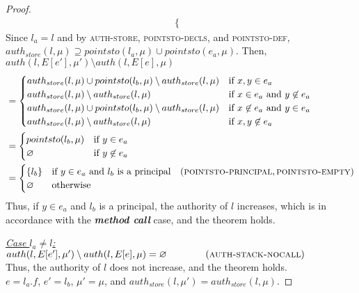 \documentclass{llncs}
\begin{document}
\begin{proof}
\begin{align*}
\begin{cases}
\end{cases}
\end{align*}
Since $l_a = l$ and by \textsc{auth-store}, \textsc{pointsto-decls}, and \textsc{pointsto-def}, $auth_{store}(l, \mu) \supseteq pointsto(l_a, \mu) \cup pointsto(e_a, \mu)$. Then, $auth(l, E[e'], \mu') \setminus auth(l, E[e], \mu)$
\begin{align*}
&=
\begin{cases}
    auth_{store}(l, \mu) \cup pointsto(l_b, \mu) \setminus auth_{store}(l, \mu) & \text{if } x, y \in e_a\\
    auth_{store}(l, \mu) \setminus auth_{store}(l, \mu) & \text{if } x \in e_a\text{ and } y \not\in e_a\\
    auth_{store}(l, \mu) \cup pointsto(l_b, \mu) \setminus auth_{store}(l, \mu) & \text{if } x \not\in e_a \text{ and } y \in e_a\\
    auth_{store}(l, \mu) \setminus auth_{store}(l, \mu) & \text{if } x, y \not\in e_a
\end{cases}\\
&=
\begin{cases}
    pointsto(l_b, \mu) & \text{if } y \in e_a\\
    \varnothing & \text{if } y \not\in e_a\\
\end{cases}\\
&=
\begin{cases}
    \{ l_b \} & \text{if } y \in e_a \text{ and } l_b \text { is a principal}~~~(\textsc{pointsto-principal}, \textsc{pointsto-empty})\\
    \varnothing & \text{otherwise}\\
\end{cases}
\end{align*}
Thus, if $y \in e_a$ and $l_b$ is a principal, the authority of $l$ increases, which is in accordance with the \textbf{\textit{method call}} case, and the theorem holds.

\noindent\underline{\textit{Case $l_a \neq l$:}} $auth(l, E[e'], \mu') \setminus auth(l, E[e], \mu) = \varnothing~~~~~~~~~~~~(\textsc{auth-stack-nocall})$\\
Thus, the authority of $l$ does not increase, and the theorem holds.\\


\noindent{}
$e = l_a.f$, $e' = l_b$, $\mu' = \mu$, and $auth_{store}(l, \mu') = auth_{store}(l, \mu)$.


\end{proof}
\end{document}
